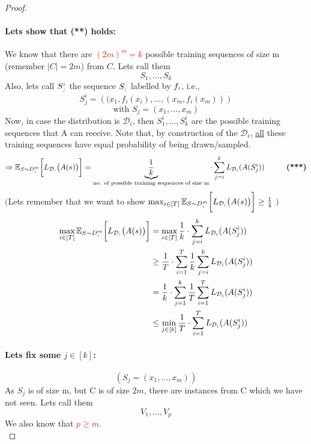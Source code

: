 \documentclass[10pt,a4paper]{article}
\theoremstyle{definition}
\theoremstyle{plain}
\begin{document}
\begin{proof}
	\paragraph{Lets show that (**) holds:} We know that there are \textcolor{red}{$(2m)^m = k$} possible training sequences of size m (remember $|C| = 2m$) from $C$. Lets call them
	$$ S_1, ..., S_k $$
	Also, lets call $S_{\textcolor{orange}{j}}^{\textcolor{red}{i}}$ the sequence $S_{\textcolor{orange}{j}}$ labelled by $f_{\textcolor{red}{i}}$, i.e.,
	$$
		S_j^i = \left((x_1, f_i(x_i), ..., (x_m, f_i(x_m))\right)
	$$ 
	$$
		\text{with } S_j = (x_1, ..., x_m)
	$$
	Now, in case the distribution is $\mathcal{D}_i$, then $S_1^i, ..., S_k^i$ are the possible training sequences that A can receive. Note that, by construction of the $\mathcal{D}_i$, \underline{all} these training sequences have equal probability of being drawn/sampled.
	$$
		\Rightarrow\mathbb{E}_{S \sim D^{m}_{\textcolor{red}{i}}}\bigg[L_{\mathcal{D}_{\textcolor{red}{i}}}\big(A(s)\big)\bigg] = \underbrace{\frac{1}{k}}_{\text{no. of possible training sequences of size m}} \cdot \sum_{j = i}^{k} L_{\mathcal{D}_i}(A(S_{j}^{i})) \hspace{1cm} \text{\textbf{(***)}}
	$$ 
	$\Big($Lets remember that we want to show
	$
		\max_{i \in [T]} \mathbb{E}_{S \sim D^{m}_{\textcolor{red}{i}}}\bigg[L_{\mathcal{D}_{\textcolor{red}{i}}}\big(A(s)\big)\bigg] \geq \frac{1}{4}
	$ $\Big)$
	\begin{align*}
		\max_{i \in [T]} \mathbb{E}_{S \sim D^{m}_{\textcolor{red}{i}}}\bigg[L_{\mathcal{D}_{\textcolor{red}{i}}}\big(A(s)\big)\bigg] &= \max_{i \in [T]} \frac{1}{k} \cdot \sum_{j = i}^{k} L_{\mathcal{D}_i}(A(S_{j}^{i}))  \\
		&\geq \frac{1}{T} \cdot \sum_{i=1}^{T} \frac{1}{k} \sum_{j = i}^{k} L_{\mathcal{D}_i}(A(S_j^i)) \\
		&= \frac{1}{k} \cdot \sum_{j=1}^{k} \frac{1}{T} \sum_{i = 1}^{T} L_{\mathcal{D}_i}(A(S_j^i))\\
		&\leq \min_{j \in [k]} \frac{1}{T} \cdot \sum_{i = 1}^{T} L_{\mathcal{D}_i}(A(S_j^i))
	\end{align*}
	\paragraph{Lets fix some $j \in [k]$:}
	$$(S_j = (x_1, ..., x_m))$$
	As $S_j$ is of size m, but C is of size $2m$, there are instances from C which we have not seen. Lets call them 
	$$ V_1, ..., V_p$$
	We also know that \textcolor{red}{$p \geq m$}.\\
	

\end{proof}
\end{document}
